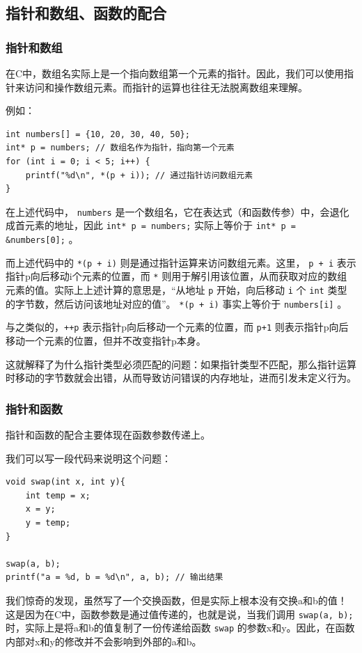 \subsection{指针和数组、函数的配合}

\subsubsection{指针和数组}

在C中，数组名实际上是一个指向数组第一个元素的指针。因此，我们可以使用指针来访问和操作数组元素。而指针的运算也往往无法脱离数组来理解。

例如：
\begin{verbatim}
int numbers[] = {10, 20, 30, 40, 50};
int* p = numbers; // 数组名作为指针，指向第一个元素
for (int i = 0; i < 5; i++) {
    printf("%d\n", *(p + i)); // 通过指针访问数组元素
}
\end{verbatim}
在上述代码中， \texttt{numbers} 是一个数组名，它在表达式（和函数传参）中，会退化成首元素的地址，因此 \texttt{int* p = numbers;} 实际上等价于 \texttt{int* p = \&numbers[0];} 。

而上述代码中的 \texttt{*(p + i)} 则是通过指针运算来访问数组元素。这里， \texttt{p + i} 表示指针p向后移动i个元素的位置，而 \texttt{*} 则用于解引用该位置，从而获取对应的数组元素的值。实际上上述计算的意思是，“从地址 \texttt{p} 开始，向后移动 \texttt{i} 个 \texttt{int} 类型的字节数，然后访问该地址对应的值”。 \texttt{*(p + i)} 事实上等价于 \texttt{numbers[i]} 。

与之类似的，\texttt{++p} 表示指针p向后移动一个元素的位置，而 \texttt{p+1} 则表示指针p向后移动一个元素的位置，但并不改变指针p本身。

这就解释了为什么指针类型必须匹配的问题：如果指针类型不匹配，那么指针运算时移动的字节数就会出错，从而导致访问错误的内存地址，进而引发未定义行为。

\subsubsection{指针和函数}

指针和函数的配合主要体现在函数参数传递上。

我们可以写一段代码来说明这个问题：
\begin{verbatim}
void swap(int x, int y){
    int temp = x;
    x = y;
    y = temp;
}

swap(a, b);
printf("a = %d, b = %d\n", a, b); // 输出结果
\end{verbatim}
我们惊奇的发现，虽然写了一个交换函数，但是实际上根本没有交换a和b的值！这是因为在C中，函数参数是通过值传递的，也就是说，当我们调用 \texttt{swap(a, b);} 时，实际上是将a和b的值复制了一份传递给函数 \texttt{swap} 的参数x和y。因此，在函数内部对x和y的修改并不会影响到外部的a和b。

